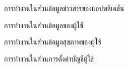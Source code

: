 \begin{figure}
    \caption{การทำงานในส่วนข้อมูลข่าวสารของแอปพลิเคชัน}
\end{figure}

\begin{figure}
    \caption{การทำงานในส่วนข้อมูลของผู้ใช้}
\end{figure}

\begin{figure}
    \caption{การทำงานในส่วนข้อมูลสุขภาพของผู้ใช้}
\end{figure}

\begin{figure}
    \caption{การทำงานในส่วนการตั้งค่าบัญชีผู้ใช้}
\end{figure}

\clearpage